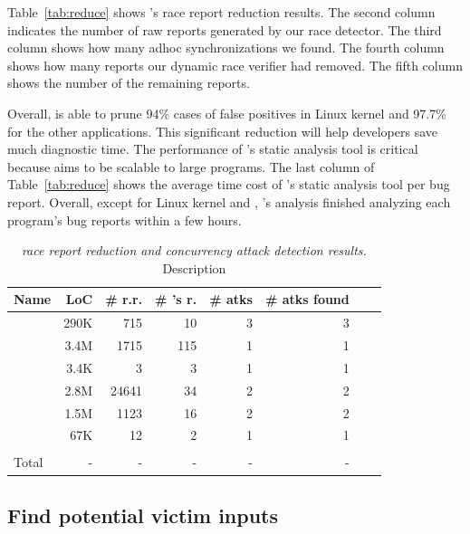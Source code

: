 Table~\ref{tab:reduce} shows \xxx's race report reduction results. The 
second
column indicates the number of raw reports generated by our race detector.
The third column shows how many adhoc synchronizations we found.
The fourth column shows how many reports
our dynamic race verifier had removed. The fifth column shows the number of the 
remaining reports.

Overall, \xxx is able to prune 94\% cases of false positives in Linux kernel 
and 97.7\%
for the other applications. This significant reduction will help developers save
much diagnostic time. The performance of \xxx's static analysis tool is critical
because \xxx aims to be scalable to large programs. The last column of
Table~\ref{tab:reduce} shows the average time 
cost of \xxx's static analysis tool per bug report. Overall, except for Linux 
kernel and \chrome, \xxx's analysis finished analyzing each program's bug 
reports within a few hours.


\begin{table}[ht!]
	\footnotesize
	\centering
	\begin{tabular}{l|r|r|r|r|r|r|r}
		{\bf Name} & {\bf LoC} & {\bf \# r.r.}& {\bf \# \xxx's r.} & {\bf \# atks} & {\bf \# atks found}  \\
		\hline
		\apache    &    290K    &   715  &  10   &  3  & 3 \\
		\chrome    &   3.4M   & 1715  &  115 &  1  & 1 \\
		\libsafe   &   3.4K     & 3  & 3 & 1 &  1 \\
		\linux     &     2.8M    & 24641  & 34  &  2  & 2  \\
		\mysql     &    1.5M    & 1123 &  16  &  2  & 2 \\
		\ssdb      &  67K   &  12  &  2  &  1  & 1  \\
		\hline\\[-2.3ex]
		Total      &   -    &  -  &  - &  - & - \\
	\end{tabular}
	\vspace{-.1in}
	\caption{{\em \xxx race report reduction and concurrency attack detection results.} \rm {Description}} 
	\label{tab:raduce}
	\vspace{-.2in}
\end{table}

\subsection{Find potential victim inputs}






